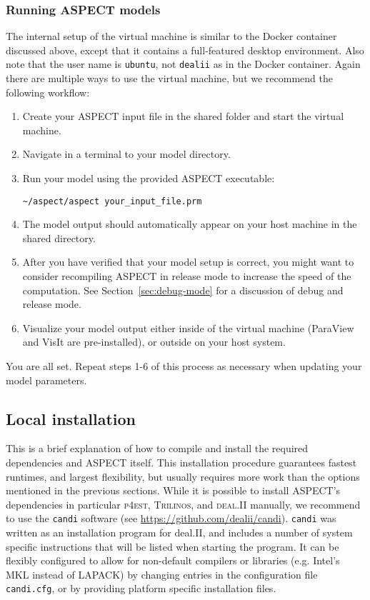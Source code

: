 \documentclass{article}
\newcommand{\dealii}{{\textsc{deal.II}}}
\newcommand{\pfrst}{{\normalfont\textsc{p4est}}}
\newcommand{\trilinos}{{\textsc{Trilinos}}}
\newcommand{\aspect}{\textsc{ASPECT}}
\begin{document}
\subsubsection{Running \aspect{} models}

The internal setup of the virtual machine is similar to the Docker container
discussed above, except that it contains a full-featured desktop environment.
Also note that the user name is \texttt{ubuntu}, not \texttt{dealii} as in the
Docker container. Again there are multiple ways to use the virtual machine, but
we recommend the following workflow:

\begin{enumerate}
\item Create your \aspect{} input file in the shared folder and start the
virtual machine.
\item Navigate in a terminal to your model directory.
\item Run your model using the provided \aspect{} executable:

\begin{lstlisting}[frame=single,language=ksh]
~/aspect/aspect your_input_file.prm
\end{lstlisting}

\item The model output should automatically appear on your host machine in the
shared directory.

\item After you have verified that your model setup is correct, you might want
to consider recompiling \aspect{} in release mode to increase the speed of the
computation. See Section~\ref{sec:debug-mode} for a discussion of debug and
release mode.

\item Visualize your model output either inside of the virtual machine
(ParaView and VisIt are pre-installed), or outside on your host system.
\end{enumerate}

You are all set. Repeat steps 1-6 of this process as necessary when updating
your model parameters. 

\subsection{Local installation}

This is a brief explanation of how to compile and install the required dependencies and
\aspect{} itself. This installation procedure guarantees fastest runtimes, and largest flexibility,
but usually requires more work than the options mentioned in the previous sections. 
While it is possible to install ASPECT's dependencies in particular \pfrst{}, \trilinos{}, 
and \dealii{} manually, we recommend to use the 
\texttt{candi} software (see \url{https://github.com/dealii/candi}). \texttt{candi} was written
as an installation program for deal.II, and includes a number of system specific instructions
that will be listed when starting the program. It can be flexibly configured to allow for
non-default compilers or libraries (e.g. Intel's MKL instead of LAPACK) by changing entries
in the configuration file \texttt{candi.cfg}, or by providing platform specific installation files.
\end{document}
